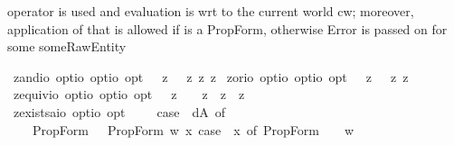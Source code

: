 \begin{isabellebody}
\begin{isamarkuptext}
operator is used and evaluation is wrt to the current world cw; moreover, application of that 
is allowed if  is a PropForm, otherwise Error is passed on for some someRawEntity%
\end{isamarkuptext}%
\isamarkuptrue%
%
\isamarkuptrue%
\isamarkupfalse%
\ z{\isacharunderscore}and{\isacharcolon}{\isacharcolon}{\isachardoublequoteopen}io\ opt{\isasymRightarrow}io\ opt{\isasymRightarrow}io\ opt{\isachardoublequoteclose}\ \ {\isachardoublequoteopen}{\isasymphi}\ {\isasymand}\isactrlsup z\ {\isasympsi}\ {\isasymequiv}\ {\isasymnot}\isactrlsup z{\isacharparenleft}{\isasymphi}\ {\isasymrightarrow}\isactrlsup z\ {\isasymnot}\isactrlsup z{\isasympsi}{\isacharparenright}{\isachardoublequoteclose}\isanewline
{}\isamarkupfalse%
\ z{\isacharunderscore}or{\isacharcolon}{\isacharcolon}{\isachardoublequoteopen}io\ opt{\isasymRightarrow}io\ opt{\isasymRightarrow}io\ opt{\isachardoublequoteclose}\ \ {\isachardoublequoteopen}{\isasymphi}\ {\isasymor}\isactrlsup z\ {\isasympsi}\ {\isasymequiv}\ {\isacharparenleft}{\isasymnot}\isactrlsup z{\isasymphi}\ {\isasymrightarrow}\isactrlsup z\ {\isasympsi}{\isacharparenright}{\isachardoublequoteclose}\isanewline
{}\isamarkupfalse%
\ z{\isacharunderscore}equiv{\isacharcolon}{\isacharcolon}{\isachardoublequoteopen}io\ opt{\isasymRightarrow}io\ opt{\isasymRightarrow}io\ opt{\isachardoublequoteclose}\ \ {\isachardoublequoteopen}{\isasymphi}\ {\isasymequiv}\isactrlsup z\ {\isasympsi}\ {\isasymequiv}\ {\isacharparenleft}{\isasymphi}\ {\isasymrightarrow}\isactrlsup z\ {\isasympsi}{\isacharparenright}\ {\isasymand}\isactrlsup z\ {\isacharparenleft}{\isasympsi}\ {\isasymrightarrow}\isactrlsup z\ {\isasymphi}{\isacharparenright}{\isachardoublequoteclose}\isanewline
{}\isamarkupfalse%
\ z{\isacharunderscore}exists{\isacharcolon}{\isacharcolon}{\isachardoublequoteopen}{\isacharparenleft}{\isacharprime}a{\isasymRightarrow}io\ opt{\isacharparenright}{\isasymRightarrow}io\ opt{\isachardoublequoteclose}\ \ {\isachardoublequoteopen}{\isasymexists}\ {\isasymPhi}\ {\isasymequiv}\ case\ {\isacharparenleft}{\isasymPhi}\ dA{\isacharparenright}\ of\isanewline
\ \ \ \ PropForm\ {\isasymphi}\ {\isasymRightarrow}\ PropForm\ {\isacharparenleft}{\isasymlambda}w{\isachardot}\ {\isasymexists}x{\isachardot}\ case\ {\isacharparenleft}{\isasymPhi}\ x{\isacharparenright}\ of\ PropForm\ {\isasympsi}\ {\isasymRightarrow}\ {\isasympsi}\ w{\isacharparenright}\isanewline

\end{isabellebody}
